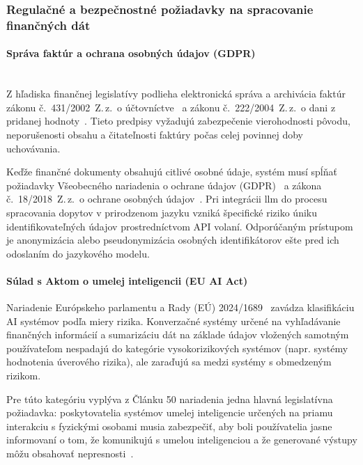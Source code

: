 \subsubsection{Regulačné a bezpečnostné požiadavky na spracovanie finančných dát}

\paragraph{Správa faktúr a ochrana osobných údajov (GDPR)}
\mbox{}\\

Z hľadiska finančnej legislatívy podlieha elektronická správa a archivácia
faktúr zákonu č.~431/2002~Z.\,z.\ o účtovníctve~\cite{zakon431} a zákonu č.~222/2004~Z.\,z.\ o
dani z pridanej hodnoty~\cite{zakon222}. Tieto predpisy vyžadujú zabezpečenie vierohodnosti
pôvodu, neporušenosti obsahu a čitateľnosti faktúry počas celej povinnej doby
uchovávania.

Keďže finančné dokumenty obsahujú citlivé osobné údaje, systém musí spĺňať požiadavky
Všeobecného nariadenia o ochrane údajov (GDPR)~\cite{eu2016gdpr} a zákona č.~18/2018~Z.\,z.\ o
ochrane osobných údajov~\cite{zakon18}. Pri integrácii \gls{llm} do procesu
spracovania dopytov v prirodzenom jazyku vzniká špecifické riziko úniku
identifikovateľných údajov prostredníctvom API volaní. Odporúčaným prístupom je anonymizácia
alebo pseudonymizácia osobných identifikátorov ešte pred ich odoslaním do jazykového
modelu.

\paragraph{Súlad s Aktom o umelej inteligencii (EU AI Act)}

Nariadenie Európskeho parlamentu a Rady (EÚ) 2024/1689~\cite{euaiact2024} zavádza
klasifikáciu AI systémov podľa miery rizika. Konverzačné systémy určené na
vyhľadávanie finančných informácií a sumarizáciu dát na základe údajov vložených
samotným používateľom nespadajú do kategórie vysokorizikových systémov (napr.
systémy hodnotenia úverového rizika), ale zaraďujú sa medzi systémy s obmedzeným
rizikom.

Pre túto kategóriu vyplýva z Článku 50 nariadenia jedna hlavná legislatívna
požiadavka: poskytovatelia systémov umelej inteligencie určených na priamu interakciu
s fyzickými osobami musia zabezpečiť, aby boli používatelia jasne informovaní o
tom, že komunikujú s umelou inteligenciou a že generované výstupy môžu obsahovať nepresnosti~\cite{euaiact2024}.

